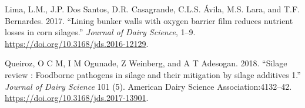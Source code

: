 \documentclass[]{article}
\begin{document}
\hypertarget{refs}{}
\leavevmode\hypertarget{ref-Lima2017}{}%
Lima, L.M., J.P. Dos Santos, D.R. Casagrande, C.L.S. Ávila, M.S. Lara,
and T.F. Bernardes. 2017. ``Lining bunker walls with oxygen barrier film
reduces nutrient losses in corn silages.'' \emph{Journal of Dairy
Science}, 1--9. \url{https://doi.org/10.3168/jds.2016-12129}.

\leavevmode\hypertarget{ref-Queiroz2018}{}%
Queiroz, O C M, I M Ogunade, Z Weinberg, and A T Adesogan. 2018.
``Silage review : Foodborne pathogens in silage and their mitigation by
silage additives 1.'' \emph{Journal of Dairy Science} 101 (5). American
Dairy Science Association:4132--42.
\url{https://doi.org/10.3168/jds.2017-13901}.
\end{document}
